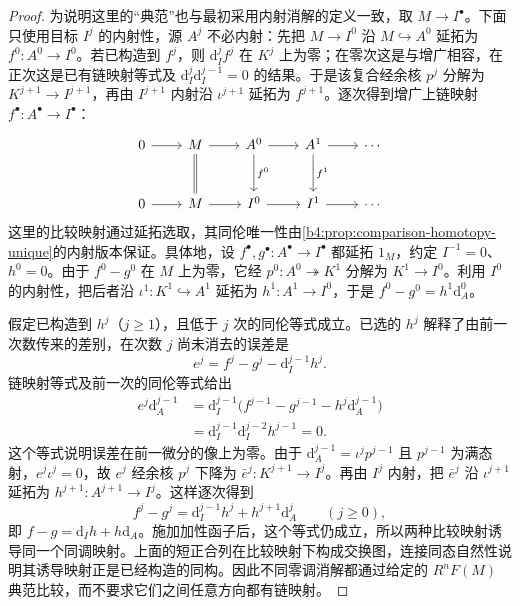 \begin{proof}
	为说明这里的“典范”也与最初采用内射消解的定义一致，取 \(M\to I^\bullet\)。下面只使用目标 \(I^j\) 的内射性，源 \(A^j\) 不必内射：先把 \(M\to I^0\) 沿 \(M\hookrightarrow A^0\) 延拓为 \(f^0:A^0\to I^0\)。若已构造到 \(f^j\)，则 \(\mathrm{d}_I^jf^j\) 在 \(K^j\) 上为零；在零次这是与增广相容，在正次这是已有链映射等式及 \(\mathrm{d}_I^j\mathrm{d}_I^{j-1}=0\) 的结果。于是该复合经余核 \(p^j\) 分解为 \(K^{j+1}\to I^{j+1}\)，再由 \(I^{j+1}\) 内射沿 \(\iota^{j+1}\) 延拓为 \(f^{j+1}\)。逐次得到增广上链映射 \(f^\bullet:A^\bullet\to I^\bullet\)：
	\[
		\begin{tikzcd}[column sep=2.2em,row sep=large]
			0\arrow[r]&M\arrow[r]\arrow[d,equal]&A^0\arrow[r]\arrow[d,"f^0"]&A^1\arrow[r]\arrow[d,"f^1"]&\cdots\\
			0\arrow[r]&M\arrow[r]&I^0\arrow[r]&I^1\arrow[r]&\cdots
		\end{tikzcd}
	\]
	这里的比较映射通过延拓选取，其同伦唯一性由\cref{b4:prop:comparison-homotopy-unique}的内射版本保证。具体地，设 \(f^\bullet,g^\bullet:A^\bullet\to I^\bullet\) 都延拓 \(1_M\)，约定 \(I^{-1}=0\)、\(h^0=0\)。由于 \(f^0-g^0\) 在 \(M\) 上为零，它经 \(p^0:A^0\twoheadrightarrow K^1\) 分解为 \(K^1\to I^0\)。利用 \(I^0\) 的内射性，把后者沿 \(\iota^1:K^1\hookrightarrow A^1\) 延拓为 \(h^1:A^1\to I^0\)，于是 \(f^0-g^0=h^1\mathrm{d}_A^0\)。

	假定已构造到 \(h^j\)（\(j\ge1\)），且低于 \(j\) 次的同伦等式成立。已选的 \(h^j\) 解释了由前一次数传来的差别，在次数 \(j\) 尚未消去的误差是
	\[
		e^j=f^j-g^j-\mathrm{d}_I^{j-1}h^j.
	\]
	链映射等式及前一次的同伦等式给出
	\[
		\begin{aligned}
			e^j\mathrm{d}_A^{j-1} &=\mathrm{d}_I^{j-1} \bigl(f^{j-1}-g^{j-1}-h^j\mathrm{d}_A^{j-1}\bigr)\\
			&=\mathrm{d}_I^{j-1}\mathrm{d}_I^{j-2}h^{j-1}=0.
		\end{aligned}
	\]
	这个等式说明误差在前一微分的像上为零。由于 \(\mathrm{d}_A^{j-1}=\iota^jp^{j-1}\) 且 \(p^{j-1}\) 为满态射，\(e^j\iota^j=0\)，故 \(e^j\) 经余核 \(p^j\) 下降为 \(\bar e^j:K^{j+1}\to I^j\)。再由 \(I^j\) 内射，把 \(\bar e^j\) 沿 \(\iota^{j+1}\) 延拓为 \(h^{j+1}:A^{j+1}\to I^j\)。这样逐次得到
	\[
		f^j-g^j=\mathrm{d}_I^{j-1}h^j+h^{j+1}\mathrm{d}_A^j \qquad(j\ge0),
	\]
	即 \(f-g=\mathrm{d}_Ih+h\mathrm{d}_A\)。施加加性函子后，这个等式仍成立，所以两种比较映射诱导同一个同调映射。上面的短正合列在比较映射下构成交换图，连接同态自然性说明其诱导映射正是已经构造的同构。因此不同零调消解都通过给定的 \(R^nF(M)\) 典范比较，而不要求它们之间任意方向都有链映射。
\end{proof}

